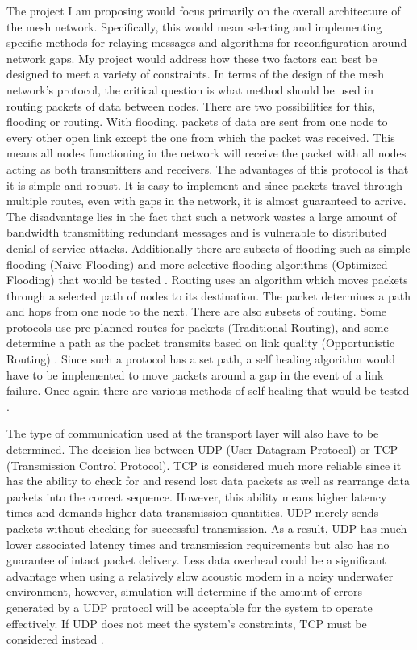 \documentclass[10pt]{article}
\begin{document}
The project I am proposing would focus primarily on the overall architecture of the mesh network. Specifically, this would mean selecting and implementing specific methods for relaying messages and algorithms for reconfiguration around network gaps. My project would address how these two factors can best be designed to meet a variety of constraints. In terms of the design of the mesh network’s protocol, the critical question is what method should be used in routing packets of data between nodes. There are two possibilities for this, flooding or routing. With flooding, packets of data are sent from one node to every other open link except the one from which the packet was received. This means all nodes functioning in the network will receive the packet with all nodes acting as both transmitters and receivers. The advantages of this protocol is that it is simple and robust. It is easy to implement and since packets travel through multiple routes, even with gaps in the network, it is almost guaranteed to arrive. The disadvantage lies in the fact that such a network wastes a large amount of bandwidth transmitting redundant messages and is vulnerable to distributed denial of service attacks. Additionally there are subsets of flooding such as simple flooding (Naive Flooding) and more selective flooding algorithms (Optimized Flooding) that would be tested \cite{zahn2009empirical}. Routing uses an algorithm which moves packets through a selected path of nodes to its destination. The packet determines a path and hops from one node to the next. There are also subsets of routing. Some protocols use pre planned routes for packets (Traditional Routing), and some determine a path as the packet transmits based on link quality (Opportunistic Routing)  \cite{hamraz2019wireless}. Since such a protocol has a set path, a self healing algorithm would have to be implemented to move packets around a gap in the event of a link failure. Once again there are various methods of self healing that would be tested \cite{trehan2019algorithms}.

The type of communication used at the transport layer will also have to be determined. The decision lies between UDP (User Datagram Protocol) or TCP (Transmission Control Protocol). TCP is considered much more reliable since it has the ability to check for and resend lost data packets as well as rearrange data packets into the correct sequence. However, this ability means higher latency times and demands higher data transmission quantities. UDP merely sends packets without checking for successful transmission. As a result, UDP has much lower associated latency times and transmission requirements but also has no guarantee of intact packet delivery. Less data overhead could be a significant advantage when using a relatively slow acoustic modem in a noisy underwater environment, however, simulation will determine if the amount of errors generated by a UDP protocol will be acceptable for the system to operate effectively. If UDP does not meet the system’s constraints, TCP must be considered instead \cite{rouse2019what}.
\end{document}
